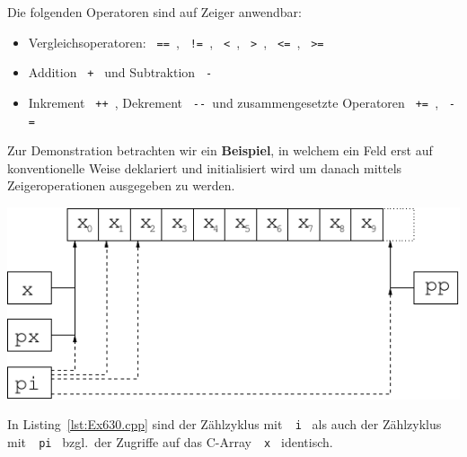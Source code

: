 Die folgenden Operatoren sind auf Zeiger anwendbar:
\begin{itemize}
 \item Vergleichsoperatoren:
   \verb| == |, \verb| != |, \verb| < |, \verb| > |, \verb| <= |, \verb| >= |
 \item Addition \verb| + | und Subtraktion \verb| - |
 \item Inkrement \verb| ++ |, Dekrement \verb| -- |und
 	zusammengesetzte Operatoren \verb| += |, \verb| -= |
\end{itemize}

Zur Demonstration betrachten wir ein \textbf{Beispiel}, in welchem
ein Feld erst auf konventionelle Weise deklariert und initialisiert wird um
danach mittels Zeigeroperationen ausgegeben zu werden.

% 
\centerline{\includegraphics[scale=1.1]{kap632_b.pdf}}
%
%
In Listing~\ref{lst:Ex630.cpp} sind der Zählzyklus mit~\verb| i | als 
auch der Zählzyklus mit~\verb| pi | bzgl.\  der Zugriffe auf das C-Array~\verb| x | 
identisch. 



